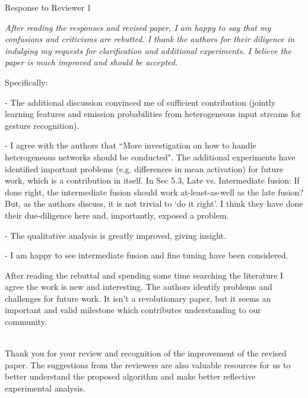 \newcommand{\rev}[1]{{\noindent {\bf Comment:} {\it #1}}~\\[-2mm]}
\newcommand{\ans}[1]{{\noindent {\bf Response:} #1}~\\[-2mm]}
\newcommand{\td}[1]{{\noindent {\bf TODO:} #1}~\\}


\newcommand{\PM}[1]{
~\\[-4mm]
``{\em #1}''
}


\newpage
{\LARGE \noindent Response to Reviewer 1}\newline

\rev{
After reading the responses and revised paper, I am happy to say that my confusions and criticisms are rebutted. I thank the authors for their diligence in indulging my requests for clarification and additional experiments. I believe the paper is much improved and should be accepted.

Specifically:

- The additional discussion convinced me of sufficient contribution (jointly learning features and emission probabilities from heterogeneous input streams for gesture recognition).
	
- I agree with the authors that ``More investigation on how to handle heterogeneous networks should be conducted". The additional experiments have identified important problems
(e.g. differences in mean activation) for future work, which is a contribution in itself. In Sec 5.3, Late vs. Intermediate fusion: If done right, the intermediate fusion should work at-least-as-well as the late fusion? But, as the authors discuss, it is not trivial to `do it right'. I think they have done their due-diligence here and, importantly, exposed a problem.

- The qualitative analysis is greatly improved, giving insight.

- I am happy to see intermediate fusion and fine tuning have been considered.

 After reading the rebuttal and spending some time searching the literature I agree the work is new and interesting. The authors identify problems and
challenges for future work. It isn't a revolutionary paper, but it seems an important and valid milestone which contributes understanding to our community.
}

\ans{
Thank you for your review and recognition of the improvement of the revised paper. The suggestions from the reviewers are also valuable resources for us to better understand the proposed algorithm and make better reflective experimental analysis.
}


